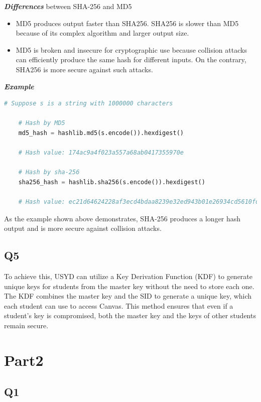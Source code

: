 \documentclass{article}
\begin{document}
\textbf{\textit{Differences}} between SHA-256 and MD5
\begin{itemize}
	\item MD5 produces output faster than SHA256. SHA256 is slower than MD5 because of its complex algorithm and larger output size\cite{9573660}.

	\item MD5 is broken and insecure for cryptographic use because collision attacks can efficiently produce the same hash for different inputs\cite{2-1-1.Hash(1)}. On the contrary, SHA256 is more secure against such attacks.
\end{itemize}

\textbf{\textit{Example}}

	\begin{lstlisting}[language=Python]
	# Suppose s is a string with 1000000 characters

	# Hash by MD5
	md5_hash = hashlib.md5(s.encode()).hexdigest()

	# Hash value: 174ac9a4f023a557a68ab0417355970e

	# Hash by sha-256
	sha256_hash = hashlib.sha256(s.encode()).hexdigest()

	# Hash value: ec21d64624228af3ecd4bdaa8239e32ed943b01e26934cd5610fddb361426dc6
	\end{lstlisting}

	As the example shown above demonstrates, SHA-256 produces a longer hash output and is more secure against collision attacks.

\subsection{Q5}

	To achieve this, USYD can utilize a Key Derivation Function (KDF) to generate unique keys for students from the master key without the need to store each one. The KDF combines the master key and the SID to generate a unique key\cite{adams2004security}, which each student can use to access Canvas. This method ensures that even if a student's key is compromised, both the master key and the keys of other students remain secure.


\section{Part2}

\subsection{Q1}
\end{document}
